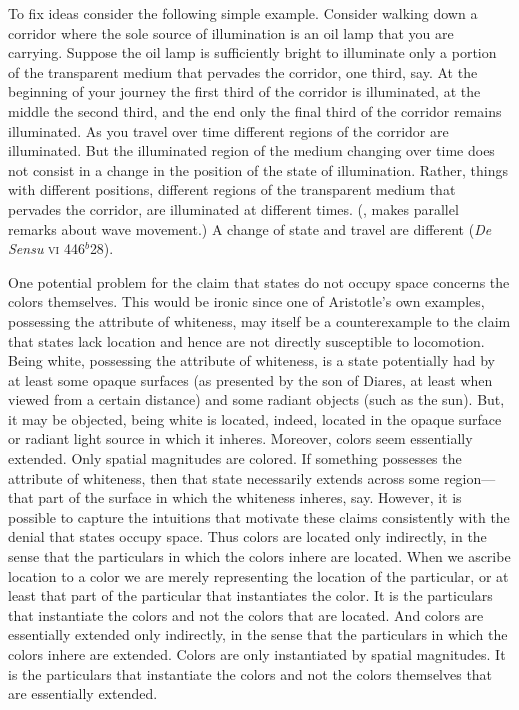 To fix ideas consider the following simple example. Consider walking down a corridor where the sole source of illumination is an oil lamp that you are carrying. Suppose the oil lamp is sufficiently bright to illuminate only a portion of the transparent medium that pervades the corridor, one third, say. At the beginning of your journey the first third of the corridor is illuminated, at the middle the second third, and the end only the final third of the corridor remains illuminated. As you travel over time different regions of the corridor are illuminated. But the illuminated region of the medium changing over time does not consist in a change in the position of the state of illumination. Rather, things with different positions, different regions of the transparent medium that pervades the corridor, are illuminated at different times. (\citealt[99]{Prichard:1950tg}, makes parallel remarks about wave movement.) A change of state and travel are different (\emph{De Sensu} \textsc{vi} 446\( ^{b} \)28).

One potential problem for the claim that states do not occupy space concerns the colors themselves. This would be ironic since one of Aristotle's own examples, possessing the attribute of whiteness, may itself be a counterexample to the claim that states lack location and hence are not directly susceptible to locomotion. Being white, possessing the attribute of whiteness, is a state potentially had by at least some opaque surfaces (as presented by the son of Diares, at least when viewed from a certain distance) and some radiant objects (such as the sun). But, it may be objected, being white is located, indeed, located in the opaque surface or radiant light source in which it inheres. Moreover, colors seem essentially extended. Only spatial magnitudes are colored. If something possesses the attribute of whiteness, then that state necessarily extends across some region---that part of the surface in which the whiteness inheres, say. However, it is possible to capture the intuitions that motivate these claims consistently with the denial that states occupy space. Thus colors are located only indirectly, in the sense that the particulars in which the colors inhere are located. When we ascribe location to a color we are merely representing the location of the particular, or at least that part of the particular that instantiates the color. It is the particulars that instantiate the colors and not the colors that are located. And colors are essentially extended only indirectly, in the sense that the particulars in which the colors inhere are extended. Colors are only instantiated by spatial magnitudes. It is the particulars that instantiate the colors and not the colors themselves that are essentially extended.

